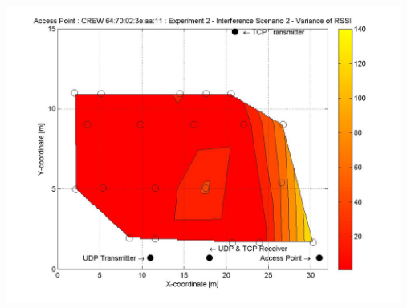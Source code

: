 \documentclass[11pt,a4paper,headinclude,footinclude,chapterprefix=on]{scrreprt}
\begin{document}
\begin{longtable}
	\includegraphics[width=13cm]{../../Source/plot/CREW_11/11_Wifi_Ex_2_Variance.jpg} \\
\end{longtable}
\end{document}

